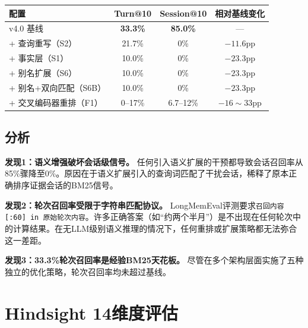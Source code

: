 \documentclass[11pt,a4paper]{ctexart}
\begin{document}
\begin{table}[h]
\centering
\begin{tabular}{lccc}
\toprule
\textbf{配置} & \textbf{Turn@10} & \textbf{Session@10} & \textbf{相对基线变化} \\
\midrule
v4.0 基线 & \textbf{33.3\%} & \textbf{85.0\%} & — \\
+ 查询重写（S2） & 21.7\% & 0\% & $-11.6$pp \\
+ 事实层（S1） & 10.0\% & 0\% & $-23.3$pp \\
+ 别名扩展（S6） & 10.0\% & 0\% & $-23.3$pp \\
+ 别名+双向匹配（S6B） & 10.0\% & 0\% & $-23.3$pp \\
+ 交叉编码器重排（F1） & 0–17\% & 6.7–12\% & $-16\sim33$pp \\
\bottomrule
\end{tabular}
\end{table}

\subsection{分析}

\textbf{发现1：语义增强破坏会话级信号。} 任何引入语义扩展的干预都导致会话召回率从85\%骤降至0\%。原因在于语义扩展引入的查询词匹配了干扰会话，稀释了原本正确排序证据会话的BM25信号。

\textbf{发现2：轮次召回率受限于字符串匹配协议。} LongMemEval评测要求\texttt{召回内容[:60] in 原始轮次内容}。许多正确答案（如“约两个半月”）是不出现在任何轮次中的计算结果。在无LLM级别语义推理的情况下，任何重排或扩展策略都无法弥合这一差距。

\textbf{发现3：33.3\%轮次召回率是经验BM25天花板。} 尽管在多个架构层面实施了五种独立的优化策略，轮次召回率均未超过基线。

\section{Hindsight 14维度评估}
\end{document}
